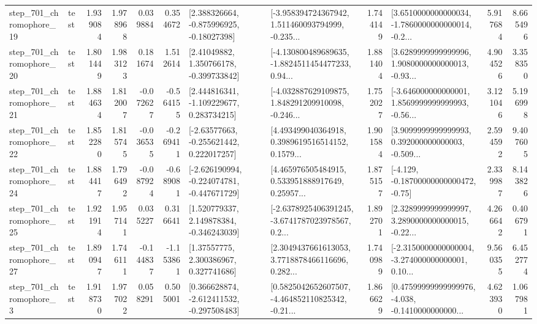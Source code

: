 \begin{tabular}{llrrrrllrlrr}
  step\_701\_chromophore\_19 &      test &      1.939084 &    1.978968 &      0.039884 &  0.354672 &    [2.388326664, -0.875996925, -0.18027398] &  [-3.958394724367942, 1.511460093794999, -0.235... &       1.744149 &  [3.6510000000000034, -1.7860000000000014, -0.2... &            5.917684 &          8.665496 \\
  step\_701\_chromophore\_20 &      test &      1.801449 &    1.983123 &      0.181674 &  1.512614 &     [2.41049882, 1.350766178, -0.399733842] &  [-4.130800489689635, -1.8824511454477233, 0.94... &       1.881404 &  [3.6289999999999996, 1.9080000000000013, -0.93... &            4.904526 &          3.358350 \\
  step\_701\_chromophore\_21 &      test &      1.884634 &    1.812007 &     -0.072627 & -0.564155 &    [2.444816341, -1.109229677, 0.283734215] &  [-4.032887629109875, 1.848291209910098, -0.246... &       1.752027 &  [-3.646000000000001, 1.8569999999999993, -0.56... &            3.121046 &          5.196998 \\
  step\_701\_chromophore\_22 &      test &      1.852280 &    1.815745 &     -0.036535 & -0.269411 &    [-2.63577663, -0.255621442, 0.222017257] &  [4.493499040364918, 0.3989619516514152, 0.1579... &       1.901584 &  [3.9099999999999993, 0.392000000000003, -0.509... &            2.594592 &          9.407605 \\
  step\_701\_chromophore\_24 &      test &      1.884417 &    1.796492 &     -0.087924 & -0.689081 &  [-2.626190994, -0.224074781, -0.447671729] &  [4.465976505484915, 0.533951888917649, 0.25957... &       1.875157 &              [-4.129, -0.18700000000000472, -0.75] &            2.339987 &          8.143826 \\
  step\_701\_chromophore\_25 &      test &      1.921914 &    1.957141 &      0.035227 &  0.316641 &    [1.520779337, 2.149878384, -0.346243039] &  [-2.6378925406391245, -3.6741787023978567, 0.2... &       1.892701 &  [2.3289999999999997, 3.2890000000000015, -0.22... &            4.266642 &          0.406791 \\
  step\_701\_chromophore\_27 &      test &      1.890947 &    1.746111 &     -0.144837 & -1.153861 &      [1.37557775, 2.300386967, 0.327741686] &  [2.3049437661613053, 3.7718878466116696, 0.282... &       1.740989 &  [-2.3150000000000004, -3.274000000000001, 0.10... &            9.560355 &          6.452774 \\
   step\_701\_chromophore\_3 &      test &      1.918730 &    1.977022 &      0.058291 &  0.505001 &   [0.366628874, -2.612411532, -0.297508483] &  [0.5825042652607507, -4.464852110825342, -0.21... &       1.866629 &  [0.47599999999999976, -4.038, -0.1410000000000... &            4.623930 &          1.067981 \\

\end{tabular}
